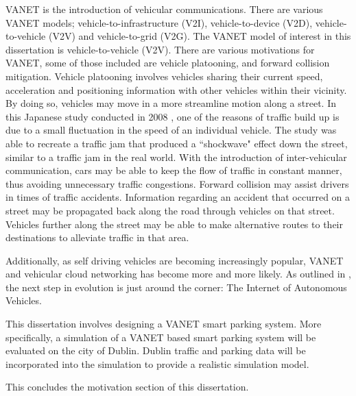 \ac{VANET} is the introduction of vehicular communications. There are various \ac{VANET} models; vehicle-to-infrastructure (V2I), vehicle-to-device (V2D), vehicle-to-vehicle (V2V) and vehicle-to-grid (V2G). The \ac{VANET} model of interest in this dissertation is vehicle-to-vehicle (V2V). There are various motivations for \ac{VANET}, some of those included are vehicle platooning, and forward collision mitigation. Vehicle platooning involves vehicles sharing their current speed, acceleration and positioning information with other vehicles within their vicinity. By doing so, vehicles may move in a more streamline motion along a street. In this Japanese study conducted in 2008 \citep{Sugiyamal2008TrafficJam}, one of the reasons of traffic build up is due to a small fluctuation in the speed of an individual vehicle. The study was able to recreate a traffic jam that produced a ``shockwave" effect down the street, similar to a traffic jam in the real world. With the introduction of inter-vehicular communication, cars may be able to keep the flow of traffic in constant manner, thus avoiding unnecessary traffic congestions. Forward collision may assist drivers in times of traffic accidents. Information regarding an accident that occurred on a street may be propagated back along the road through vehicles on that street. Vehicles further along the street may be able to make alternative routes to their destinations to alleviate traffic in that area.

Additionally, as self driving vehicles are becoming increasingly popular, \ac{VANET} and vehicular cloud networking has become more and more likely. As outlined in \citep{Gerla2014InternetClouds}, the next step in evolution is just around the corner: The Internet of Autonomous Vehicles.

This dissertation involves designing a \ac{VANET} smart parking system. More specifically, a simulation of a \ac{VANET} based smart parking system will be evaluated on the city of Dublin. Dublin traffic and parking data will be incorporated into the simulation to provide a realistic simulation model.

This concludes the motivation section of this dissertation.